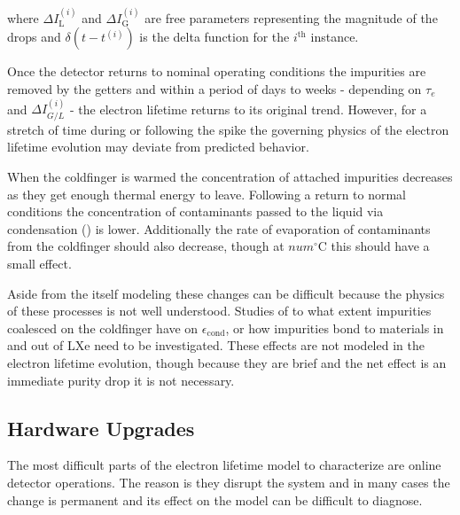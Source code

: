 \noindent where $\Delta I_{\mathrm{L}}^{(i)}$ and $\Delta I_{\mathrm{G}}^{(i)}$ are free parameters representing the magnitude of the
drops and $\delta (t - t^{(i)})$ is the delta function for the $i^{\mathrm{th}}$ instance.

Once the detector returns to nominal operating conditions the impurities are removed by the getters and within a period of days to
weeks - depending on $\tau_e$ and $\Delta I_{G/L}^{(i)}$ - the electron lifetime returns to its original trend.  However, for a stretch of
time during or following the spike the governing physics of the electron lifetime evolution may deviate from predicted behavior.

When the coldfinger is warmed the concentration of attached impurities decreases as they get enough thermal energy to leave.  Following
a return to normal conditions the concentration of contaminants passed to the liquid via condensation
() is lower.  Additionally the rate of evaporation of contaminants from
the coldfinger should also decrease, though at $num^{\circ} \mathrm{C}$ this should have a small effect.

Aside from the itself modeling these changes can be difficult because the physics of these processes is not well understood.  Studies
of to what extent impurities coalesced on the coldfinger have on $\epsilon_{\mathrm{cond}}$, or how impurities bond to materials in and
out of LXe need to be investigated.  These effects are not modeled in the electron lifetime evolution, though because they are brief and
the net effect is an immediate purity drop it is not necessary.



\subsection{Hardware Upgrades}
\label{subsec:electron_lifetime_model_ops}
The most difficult parts of the electron lifetime model to characterize are online detector operations.  The reason is they disrupt the
system and in many cases the change is permanent and its effect on the model can be difficult to diagnose.

